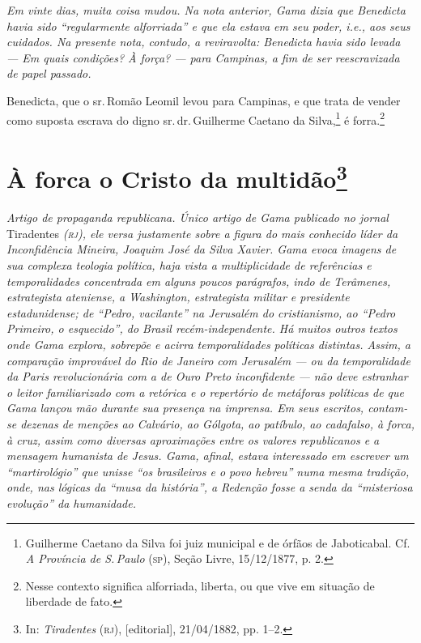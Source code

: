 {\begin{resumo}
\emph{Em vinte dias, muita coisa mudou. Na nota anterior, Gama dizia que
Benedicta havia sido ``regularmente alforriada'' e que ela estava em seu
poder, i.e., aos seus cuidados. Na presente nota, contudo, a
reviravolta: Benedicta havia sido levada --- Em quais condições? À força?
--- para Campinas, a fim de ser reescravizada de papel passado.}
\end{resumo}

Benedicta, que o sr.\,Romão Leomil levou para Campinas, e que trata de
vender como suposta escrava do digno sr.\,dr.\,Guilherme Caetano da
Silva,\footnote{Guilherme Caetano da Silva foi juiz municipal e de
  órfãos de Jaboticabal. Cf. \emph{A Província de S.\,Paulo} (\textsc{sp}), Seção
  Livre, 15/12/1877, p. 2.} é forra.\footnote{Nesse contexto significa
  alforriada, liberta, ou que vive em situação de liberdade de fato.}

\chapter{À forca o Cristo da multidão\footnote{In:
  \emph{Tiradentes} (\textsc{rj}), {[}editorial{]}, 21/04/1882, pp. 1--2.}}

\begin{resumo}
\emph{Artigo de propaganda republicana. Único artigo de Gama publicado
no jornal} Tiradentes \emph{(\textsc{rj}), ele versa justamente sobre a figura do
mais conhecido líder da Inconfidência Mineira, Joaquim José da Silva
Xavier. Gama evoca imagens de sua complexa teologia política, haja vista
a multiplicidade de referências e temporalidades concentrada em alguns
poucos parágrafos, indo de Terâmenes, estrategista ateniense, a
Washington, estrategista militar e presidente estadunidense; de ``Pedro,
vacilante'' na Jerusalém do cristianismo, ao ``Pedro Primeiro, o
esquecido'', do Brasil recém-independente. Há muitos outros textos onde
Gama explora, sobrepõe e acirra temporalidades políticas distintas.
Assim, a comparação improvável do Rio de Janeiro com Jerusalém --- ou da
temporalidade da Paris revolucionária com a de Ouro Preto inconfidente
--- não deve estranhar o leitor familiarizado com a retórica e o
repertório de metáforas políticas de que Gama lançou mão durante sua
presença na imprensa. Em seus escritos, contam-se dezenas de menções ao
Calvário, ao Gólgota, ao patíbulo, ao cadafalso, à forca, à cruz, assim
como diversas aproximações entre os valores republicanos e a mensagem
humanista de Jesus. Gama, afinal, estava interessado em escrever um
``martirológio'' que unisse ``os brasileiros e o povo hebreu'' numa mesma
tradição, onde, nas lógicas da ``musa da história'', a Redenção fosse a
senda da ``misteriosa evolução'' da humanidade. }
\end{resumo}

}
